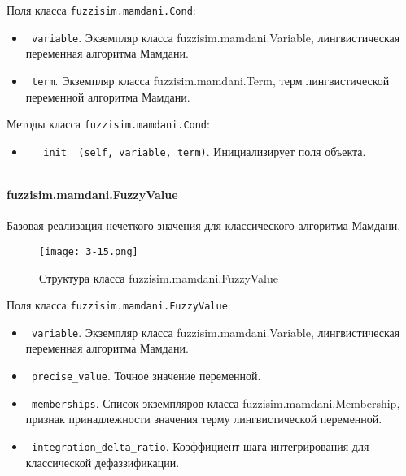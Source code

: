 Поля класса \lstinline!fuzzisim.mamdani.Cond!:
\begin{itemize}
	\item \lstinline! variable!. Экземпляр класса  fuzzisim.mamdani.Variable, лингвистическая переменная алгоритма Мамдани.
	\item \lstinline! term!.   Экземпляр класса  fuzzisim.mamdani.Term, терм лингвистической переменной алгоритма Мамдани.
\end{itemize}


Методы класса \lstinline!fuzzisim.mamdani.Cond!:
\begin{itemize}
	\item \lstinline! __init__(self, variable, term)!. Инициализирует поля объекта.
\end{itemize}

\begin{lstlisting}[style=pythonstyle,caption={  }, label=lst:func:1]

\end{lstlisting}



\paragraph{fuzzisim.mamdani.FuzzyValue}

Базовая реализация нечеткого значения для классического алгоритма Мамдани.

\begin{figure}[ht]
	\centering
	\texttt{[image: 3-15.png]}
	\caption{ Структура класса fuzzisim.mamdani.FuzzyValue}
\end{figure}

Поля класса \lstinline!fuzzisim.mamdani.FuzzyValue!:
\begin{itemize}
	\item \lstinline! variable!. Экземпляр класса  fuzzisim.mamdani.Variable, лингвистическая переменная алгоритма Мамдани.
	\item \lstinline! precise_value!.   Точное значение переменной.
	\item \lstinline! memberships!. Список экземпляров класса   fuzzisim.mamdani.Membership, признак принадлежности значения терму лингвистической переменной.
	\item \lstinline! integration_delta_ratio!.   Коэффициент шага интегрирования для классической дефаззификации.
\end{itemize}


